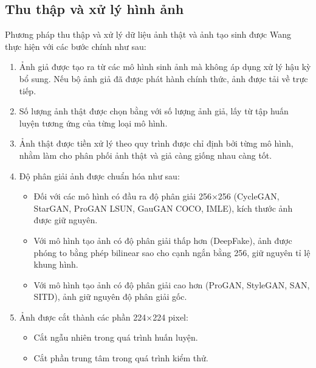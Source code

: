 \subsection{Thu thập và xử lý hình ảnh}
\label{ssec:thu_thap_va_xu_ly_hinh_anh}
%
Phương pháp thu thập và xử lý dữ liệu ảnh thật và ảnh tạo sinh được Wang~\cite{Wang2019CNNGeneratedIA} thực hiện với các bước chính như sau:
%
%
\begin{enumerate}
	\item Ảnh giả được tạo ra từ các mô hình sinh ảnh mà không áp dụng xử lý hậu kỳ bổ sung. Nếu bộ ảnh giả đã được phát hành chính thức, ảnh được tải về trực tiếp.
	
	\item Số lượng ảnh thật được chọn bằng với số lượng ảnh giả, lấy từ tập huấn luyện tương ứng của từng loại mô hình.
	
	\item Ảnh thật được tiền xử lý theo quy trình được chỉ định bởi từng mô hình, nhằm làm cho phân phối ảnh thật và giả càng giống nhau càng tốt.
	
	\item Độ phân giải ảnh được chuẩn hóa như sau:
	\begin{itemize}
		\item Đối với các mô hình có đầu ra độ phân giải 256×256 (CycleGAN, StarGAN, ProGAN LSUN, GauGAN COCO, IMLE), kích thước ảnh được giữ nguyên.
		\item Với mô hình tạo ảnh có độ phân giải thấp hơn (DeepFake), ảnh được phóng to bằng phép \gls{bilinear} sao cho cạnh ngắn bằng 256, giữ nguyên tỉ lệ khung hình.
		\item Với mô hình tạo ảnh có độ phân giải cao hơn (ProGAN, StyleGAN, SAN, SITD), ảnh giữ nguyên độ phân giải gốc.
	\end{itemize}
	
	\item Ảnh được cắt thành các phần 224×224 pixel:
	\begin{itemize}
		\item Cắt ngẫu nhiên trong quá trình huấn luyện.
		\item Cắt phần trung tâm trong quá trình kiểm thử.
	\end{itemize}
	
\end{enumerate}
%
%

